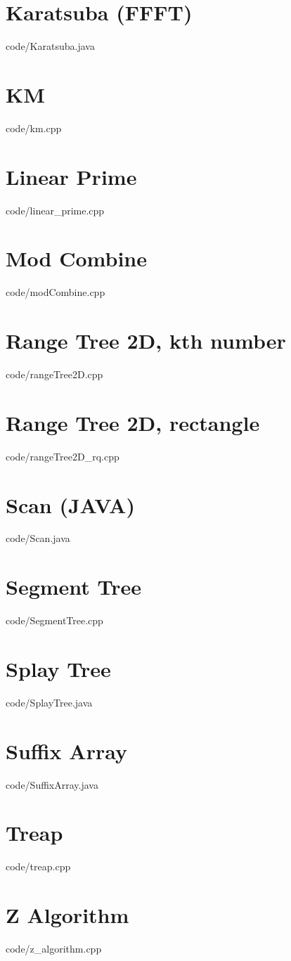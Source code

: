 \documentclass [landscape,10pt,a4paper,twocolumn]{article}
\begin{document}
\section{Karatsuba (FFFT)}
 {code/Karatsuba.java}
\section{KM}
 {code/km.cpp}
\section{Linear Prime}
 {code/linear_prime.cpp}
\section{Mod Combine}
 {code/modCombine.cpp}
\section{Range Tree 2D, kth number}
 {code/rangeTree2D.cpp}
\section{Range Tree 2D, rectangle}
 {code/rangeTree2D_rq.cpp}
\section{Scan (JAVA)}
 {code/Scan.java}
\section{Segment Tree}
 {code/SegmentTree.cpp}
\section{Splay Tree}
 {code/SplayTree.java}
\section{Suffix Array}
 {code/SuffixArray.java}
\section{Treap}
 {code/treap.cpp}
\section{Z Algorithm}
 {code/z_algorithm.cpp}
\end{document}
